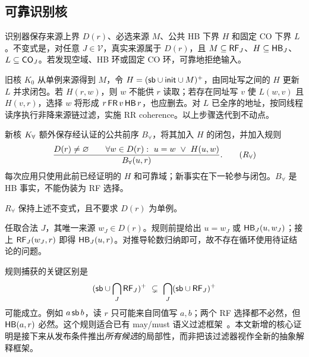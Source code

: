 \subsection{可靠识别核}
识别器保存来源上界 $D(r)$、必选来源 $M$、公共 HB 下界 $H$ 和固定 CO 下界 $L$。不变式是，对任意 $J\in\mathcal V$，真实来源属于 $D(r)$，且 $M\subseteq\mathsf{RF}_J$、$H\subseteq\mathsf{HB}_J$、$L\subseteq\mathsf{CO}_J$。若发现空域、HB 环或固定 CO 环，可靠地拒绝输入。

旧核 $K_0$ 从单例来源得到 $M$，令 $H=(\mathsf{sb}\cup\mathsf{init}\cup M)^+$，由同址写之间的 $H$ 更新 $L$ 并求闭包。若 $H(r,w)$，则 $w$ 不能供 $r$ 读取；若存在同址写 $v$ 使 $L(w,v)$ 且 $H(v,r)$，选择 $w$ 将形成 $r\,\mathsf{FR}\,v\,\mathsf{HB}\,r$，也应删去。对 $L$ 已全序的地址，按同线程读序执行非降来源链过滤，实施 RR coherence。以上步骤迭代到不动点。

新核 $K_{\forall}$ 额外保存经认证的公共前序 $B_{\forall}$，将其加入 $H$ 的闭包，并加入规则
\begin{equation}
\frac{D(r)\ne\varnothing\qquad
      \forall w\in D(r):\ u=w\ \lor\ H(u,w)}
     {B_{\forall}(u,r)}.\tag{$R_{\forall}$}\label{eq:cover}
\end{equation}
每次应用只使用此前已经证明的 $H$ 和可靠域；新事实在下一轮参与闭包。$B_{\forall}$ 是 HB 事实，不能伪装为 RF 选择。

\begin{clemma}[来源量化的可靠性]\label{lem:cover}
$R_{\forall}$ 保持上述不变式，且不要求 $D(r)$ 为单例。
\end{clemma}
\begin{cproof}
任取合法 $J$，其唯一来源 $w_J\in D(r)$。规则前提给出 $u=w_J$ 或 $\mathsf{HB}_J(u,w_J)$；接上 $\mathsf{RF}_J(w_J,r)$ 即得 $\mathsf{HB}_J(u,r)$。对推导轮数归纳即可，故不存在循环使用待证结论的问题。
\end{cproof}

规则捕获的关键区别是
\[
 (\mathsf{sb}\cup\bigcap_J\mathsf{RF}_J)^+
 \ \subsetneq\ \bigcap_J(\mathsf{sb}\cup\mathsf{RF}_J)^+
\]
可能成立。例如 $a\,\mathsf{sb}\,b$，读 $r$ 只可能来自同值写 $a,b$；两个 RF 选择都不必然，但 $\mathsf{HB}(a,r)$ 必然。这个规则适合已有 may/must 语义过滤框架~\cite{haas2023}。本文新增的核心证明是接下来从发布条件推出\emph{所有候选}的局部性，而非把该过滤器视作全新的抽象解释框架。
